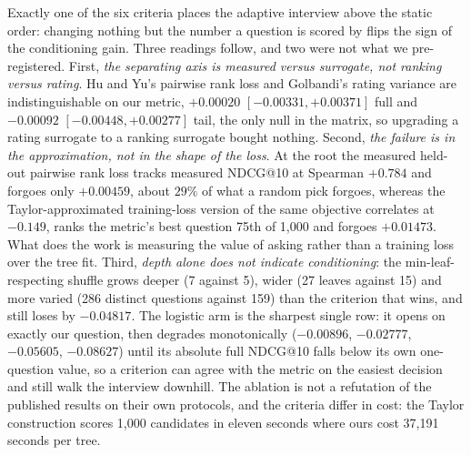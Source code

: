 \documentclass[runningheads]{llncs}
\begin{document}
Exactly one of the six criteria places the adaptive interview above the static order: changing
nothing but the number a question is scored by flips the sign of the conditioning gain. Three
readings follow, and two were not what we pre-registered. First, \emph{the separating axis is measured
versus surrogate, not ranking versus rating}. Hu and Yu's pairwise rank loss and Golbandi's rating
variance are indistinguishable on our metric, $+0.00020$ $[-0.00331,+0.00371]$ full and $-0.00092$
$[-0.00448,+0.00277]$ tail, the only null in the matrix, so upgrading a rating surrogate to a ranking
surrogate bought nothing. Second, \emph{the failure is in the approximation, not in the shape of the
loss}. At the root the measured held-out pairwise rank loss tracks measured NDCG@10 at Spearman
$+0.784$ and forgoes only $+0.00459$, about $29\%$ of what a random pick forgoes, whereas the
Taylor-approximated training-loss version of the same objective correlates at $-0.149$, ranks the
metric's best question 75th of 1{,}000 and forgoes $+0.01473$.
What does the work is measuring the value of asking rather than a training loss over the tree fit.
Third, \emph{depth alone does not indicate conditioning}: the min-leaf-respecting shuffle grows deeper
(7 against 5), wider (27 leaves against 15) and more varied (286 distinct questions against 159) than
the criterion that wins, and still loses by $-0.04817$. The logistic arm is the sharpest single row:
it opens on exactly our question, then degrades monotonically ($-0.00896$, $-0.02777$, $-0.05605$,
$-0.08627$) until its absolute full NDCG@10 falls below its own one-question value, so a criterion can
agree with the metric on the easiest decision and still walk the interview downhill. The ablation is not a
refutation of the published results on their own protocols, and the criteria differ in cost: the
Taylor construction scores 1{,}000 candidates in eleven seconds where ours cost 37{,}191 seconds per tree.
\end{document}
